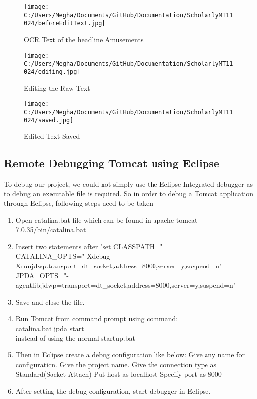 \documentclass[amsart, 12pt]{article}
\begin{document}
\begin{figure}[H]
\centering
\texttt{[image: C:/Users/Megha/Documents/GitHub/Documentation/ScholarlyMT11024/beforeEditText.jpg]}
\caption{OCR Text of the headline \textasciigrave Amusements\textasciiacute}
\label{fig:Phase 4}
\end{figure}

\begin{figure}[H]
\centering
\texttt{[image: C:/Users/Megha/Documents/GitHub/Documentation/ScholarlyMT11024/editing.jpg]}
\caption{Editing the Raw Text}
\label{fig:Phase 5}
\end{figure}

\begin{figure}[H]
\centering
\texttt{[image: C:/Users/Megha/Documents/GitHub/Documentation/ScholarlyMT11024/saved.jpg]}
\caption{Edited Text Saved}
\label{fig:Phase 6}
\end{figure}

\subsection{Remote Debugging Tomcat using Eclipse}
To debug our project, we could not simply use the Eclipse Integrated debugger as to debug an executable file is required. So in order to debug a Tomcat application through Eclipse, following steps need to be taken:
\begin{enumerate}
    \item Open catalina.bat file which can be found in apache-tomcat-7.0.35/bin/catalina.bat
\item Insert two statements after "set CLASSPATH=" \\
CATALINA\_OPTS="-Xdebug-Xrunjdwp:transport=dt\_socket,address=8000,server=y,suspend=n"\\
JPDA\_OPTS="-agentlib:jdwp=transport=dt\_socket,address=8000,server=y,suspend=n"
\item Save and close the file. 
\item Run Tomcat from command prompt using command: \\
catalina.bat jpda start \\
instead of using the normal startup.bat
\item Then in Eclipse create a debug configuration like below:
Give any name for configuration.
Give the project name.
Give the connection type as Standard(Socket Attach)
Put host as localhost
Specify port as 8000
\item After setting the debug configuration, start debugger in Eclipse.
\end{enumerate}
  
\end{document}
